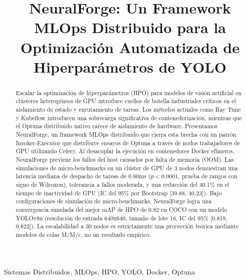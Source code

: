 \documentclass[conference]{IEEEtran}
\begin{document}
\title{NeuralForge: Un Framework MLOps Distribuido para la Optimización Automatizada de Hiperparámetros de YOLO}

\author{
}

\maketitle

\begin{abstract}
Escalar la optimización de hiperparámetros (HPO) para modelos de visión artificial en clústeres heterogéneos de GPU introduce cuellos de botella industriales críticos en el aislamiento de estado y enrutamiento de tareas. Los métodos actuales como Ray Tune y Kubeflow introducen una sobrecarga significativa de contenedorización, mientras que el Optuna distribuido nativo carece de aislamiento de hardware. Presentamos NeuralForge, un framework MLOps distribuido que cierra esta brecha con un patrón Invoker-Executor que distribuye ensayos de Optuna a través de nodos trabajadores de GPU utilizando Celery. Al desacoplar la ejecución en contenedores Docker efímeros, NeuralForge previene los fallos del host causados por falta de memoria (OOM). Las simulaciones de micro-benchmarks en un clúster de GPU de 3 nodos demuestran una latencia mediana de despacho de tareas de 0.80ms ($p < 0.0001$, prueba de rangos con signo de Wilcoxon), tolerancia a fallos moderada, y una reducción del 40.1\% en el tiempo de inactividad de GPU (IC del 95\% por Bootstrap [39.88, 40.23]). Bajo configuraciones de simulación de micro-benchmarks, NeuralForge logra una convergencia simulada del mejor mAP de HPO de 0.82 en COCO \cite{lin2014microsoft} con un modelo YOLOv8n \cite{jocher2023yolov8} (resolución de entrada 640x640, tamaño de lote 16, IC del 95\% [0.819, 0.822]). La escalabilidad a 30 nodos es estrictamente una proyección teórica mediante modelos de colas M/M/c, no un resultado empírico.
\end{abstract}

\begin{IEEEkeywords}
Sistemas Distribuidos, MLOps, HPO, YOLO, Docker, Optuna
\end{IEEEkeywords}
\end{document}

